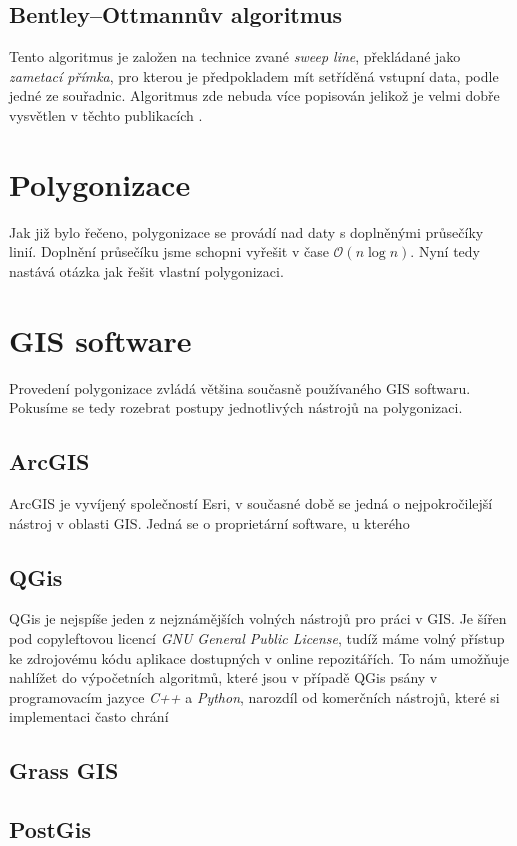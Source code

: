 \subsection{Bentley–Ottmannův algoritmus}
Tento algoritmus je založen na technice zvané \textit{sweep line}, překládané jako \textit{zametací přímka}, pro kterou je předpokladem mít setříděná vstupní data, podle jedné ze souřadnic. Algoritmus zde nebuda více popisován jelikož je velmi dobře vysvětlen v těchto publikacích \cite{bentley1979algorithms} \cite{bayer2008algoritmy}.

\section{Polygonizace}
Jak již bylo řečeno, polygonizace se provádí nad daty s doplněnými průsečíky linií. Doplnění průsečíku jsme schopni vyřešit v čase $\mathcal{O}(n\log{}n)$. Nyní tedy nastává otázka jak řešit vlastní polygonizaci.


\section{GIS software}
Provedení polygonizace zvládá většina současně používaného GIS softwaru. Pokusíme se tedy rozebrat postupy jednotlivých nástrojů na polygonizaci.

\subsection{ArcGIS}
ArcGIS je vyvíjený společností Esri, v současné době se jedná o nejpokročilejší nástroj v oblasti GIS. Jedná se o proprietární software, u kterého 


\subsection{QGis}
QGis je nejspíše jeden z nejznámějších volných nástrojů pro práci v GIS. Je šířen pod copyleftovou  licencí \textit{GNU General Public License}, tudíž máme volný přístup ke zdrojovému kódu aplikace dostupných v online repozitářích. To nám umožňuje nahlížet do výpočetních algoritmů, které jsou v případě QGis psány v programovacím jazyce \textit{C++} a \textit{Python}, narozdíl od komerčních nástrojů, které si implementaci často chrání

\subsection{Grass GIS}

\subsection{PostGis}
